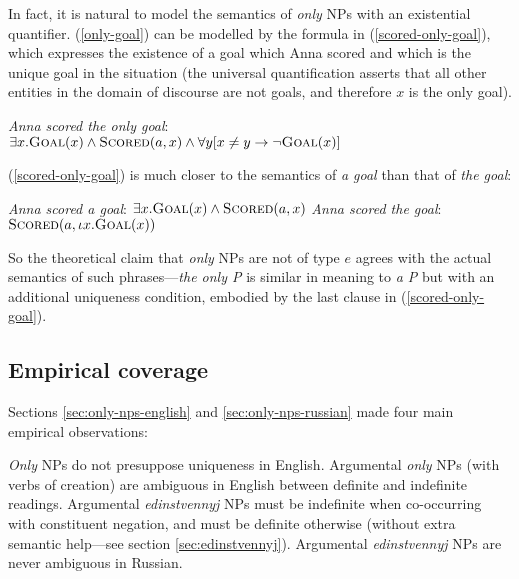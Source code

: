 In fact, it is natural to model the semantics of \textit{only} NPs with an existential quantifier. (\ref{only-goal}) can be modelled by the formula in (\ref{scored-only-goal}), which expresses the existence of a goal which Anna scored and which is the unique goal in the situation (the universal quantification asserts that all other entities in the domain of discourse are not goals, and therefore $x$ is the only goal).

\begin{exe}
	\ex \label{scored-only-goal} \textit{Anna scored the only goal}: \\ $\exists x . \textsc{Goal}(x) \land \textsc{Scored}(a, x) \land \forall y [ x \ne y \to \neg \textsc{Goal}(x) ] $
\end{exe}

(\ref{scored-only-goal}) is much closer to the semantics of \textit{a goal} than that of \textit{the goal}:

\begin{exe}
	\ex \label{a-goal} \textit{Anna scored a goal}: $\exists x . \textsc{Goal}(x) \land \textsc{Scored}(a, x)$
	\ex \label{the-goal} \textit{Anna scored the goal}: $\textsc{Scored}(a, \iota x . \textsc{Goal}(x))$
\end{exe}

So the theoretical claim that \textit{only} NPs are not of type $e$ agrees with the actual semantics of such phrases---\textit{the only P} is similar in meaning to \textit{a P} but with an additional uniqueness condition, embodied by the last clause in (\ref{scored-only-goal}).

\subsection{Empirical coverage}
Sections \ref{sec:only-nps-english} and \ref{sec:only-nps-russian} made four main empirical observations:

\begin{exe}
	\ex \label{empirical1} \textit{Only} NPs do not presuppose uniqueness in English.
	\ex \label{empirical2} Argumental \textit{only} NPs (with verbs of creation) are ambiguous in English between definite and indefinite readings.
	\ex \label{empirical3} Argumental \textit{edinstvennyj} NPs must be indefinite when co-occurring with constituent negation, and must be definite otherwise (without extra semantic help---see section \ref{sec:edinstvennyj}).
	\ex \label{empirical4} Argumental \textit{edinstvennyj} NPs are never ambiguous in Russian.
\end{exe}

